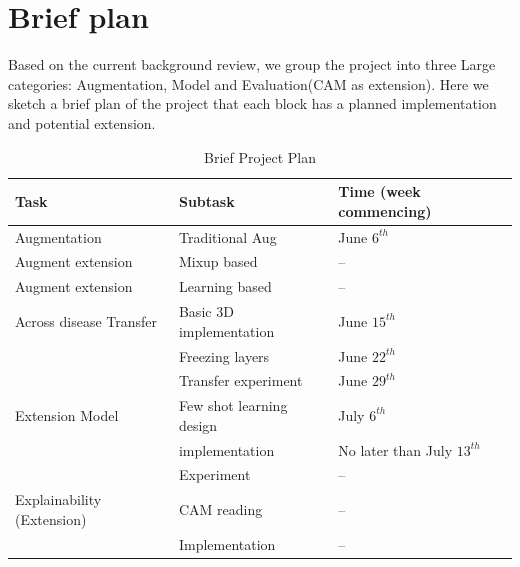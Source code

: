 \section{Brief plan}
Based on the current background review, we group the project into three Large categories: Augmentation, Model and Evaluation(CAM as extension). Here we sketch a brief plan of the project that each block has a planned implementation and potential extension.


\begin{table}[]
\begin{tabular}{lll}
\hline
\hline
Task                       & Subtask                  & Time (week commencing)       \\
\hline
Augmentation               & Traditional Aug          & June $6^{th}$                \\
Augment extension          & Mixup based              & --                           \\
Augment extension          & Learning based           & --                           \\
Across disease Transfer    & Basic 3D implementation  & June $15^{th}$               \\
                           & Freezing layers          & June $22^{th}$               \\
                           & Transfer experiment      & June $29^{th}$               \\
Extension Model            & Few shot learning design & July $6^{th}$                \\
                           & implementation           & No later than July $13^{th}$ \\
                           & Experiment               & --                           \\
Explainability (Extension) & CAM reading              & --                           \\
                           & Implementation           & --                  			 \\
\hline    
\hline    
\end{tabular}
\caption{Brief Project Plan}
\label{tab:Projplan}
\end{table}